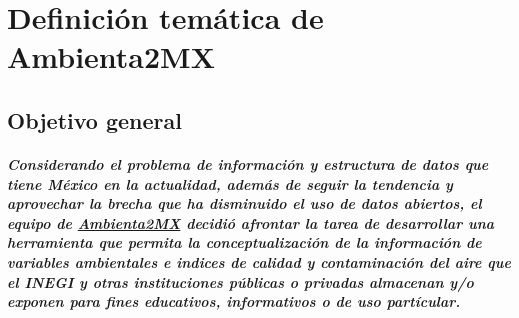 \chapter {Definici\'on tem\'atica de Ambienta2MX}
  \section {Objetivo general}
    \paragraph {Considerando el problema de informaci\'on y estructura de datos que tiene M\'exico en la actualidad, adem\'as de seguir la tendencia y aprovechar la brecha que ha disminuido el uso de datos abiertos, el equipo de \underline{Ambienta2MX} decidi\'o afrontar la tarea de desarrollar una herramienta que permita la conceptualizaci\'on de la informaci\'on de variables ambientales e indices de calidad y contaminaci\'on del aire que el INEGI y otras instituciones p\'ublicas o privadas almacenan y/o exponen para fines educativos, informativos o de uso part\'icular.}